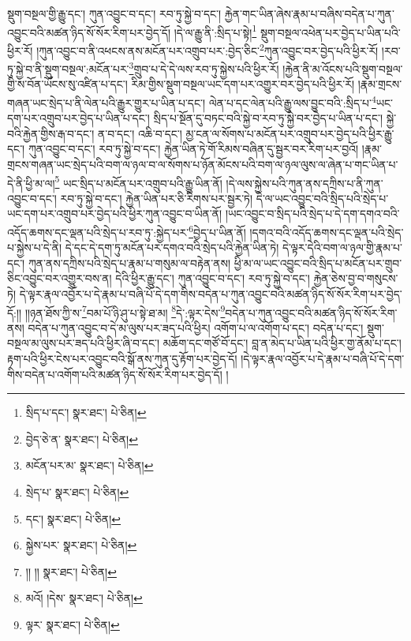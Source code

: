 སྡུག་བསྔལ་གྱི་རྒྱུ་དང་། ཀུན་འབྱུང་བ་དང་། རབ་ཏུ་སྐྱེ་བ་དང་། རྐྱེན་གང་ཡིན་ཞེས་རྣམ་པ་བཞིས་བདེན་པ་ཀུན་འབྱུང་བའི་མཚན་ཉིད་སོ་སོར་རིག་པར་བྱེད་དོ། །དེ་ལ་རྒྱུ་ནི་:སྲིད་པ་སྟེ།\footnote{སྲིད་པ་དང་།  སྣར་ཐང་།  པེ་ཅིན། } སྡུག་བསྔལ་འཕེན་པར་བྱེད་པ་ཡིན་པའི་ཕྱིར་རོ། །ཀུན་འབྱུང་བ་ནི་འཕངས་ནས་མངོན་པར་འགྲུབ་པར་:བྱེད་ཅིང་\footnote{བྱེད་ཅེ་ན་  སྣར་ཐང་།  པེ་ཅིན། }ཀུན་འབྱུང་བར་བྱེད་པའི་ཕྱིར་རོ། །རབ་ཏུ་སྐྱེ་བ་ནི་སྡུག་བསྔལ་:མངོན་པར་\footnote{མངོན་པར་མ་  སྣར་ཐང་།  པེ་ཅིན། }གྲུབ་པ་དེ་དེ་ལས་རབ་ཏུ་སྐྱེས་པའི་ཕྱིར་རོ། །རྐྱེན་ནི་མ་འོངས་པའི་སྡུག་བསྔལ་གྱི་ས་བོན་ཡོངས་སུ་འཛིན་པ་དང་། རིམ་གྱིས་སྡུག་བསྔལ་ཡང་དག་པར་འགྱུར་བར་བྱེད་པའི་ཕྱིར་རོ། །རྣམ་གྲངས་གཞན་ཡང་སྲེད་པ་ནི་ལེན་པའི་རྒྱུར་གྱུར་པ་ཡིན་པ་དང་། ལེན་པ་དང་ལེན་པའི་རྒྱུ་ལས་བྱུང་བའི་:སྲིད་པ་\footnote{སྲེད་པ་  སྣར་ཐང་།  པེ་ཅིན། }ཡང་དག་པར་འགྲུབ་པར་བྱེད་པ་ཡིན་པ་དང་། སྲིད་པ་སྔོན་དུ་བཏང་བའི་སྐྱེ་བ་རབ་ཏུ་སྐྱེ་བར་བྱེད་པ་ཡིན་པ་དང་། སྐྱེ་བའི་རྐྱེན་གྱིས་རྒ་བ་དང་། ན་བ་དང་། འཆི་བ་དང་། མྱ་ངན་ལ་སོགས་པ་མངོན་པར་འགྲུབ་པར་བྱེད་པའི་ཕྱིར་རྒྱུ་དང་། ཀུན་འབྱུང་བ་དང་། རབ་ཏུ་སྐྱེ་བ་དང་། རྐྱེན་ཡིན་ཏེ་གོ་རིམས་བཞིན་དུ་སྦྱར་བར་རིག་པར་བྱའོ། །རྣམ་གྲངས་གཞན་ཡང་སྲེད་པའི་བག་ལ་ཉལ་བ་ལ་སོགས་པ་ཉོན་མོངས་པའི་བག་ལ་ཉལ་ལུས་ལ་ཞེན་པ་གང་ཡིན་པ་དེ་ནི་ཕྱི་མ་ལ།\footnote{དང་།  སྣར་ཐང་།  པེ་ཅིན། } ཡང་སྲིད་པ་མངོན་པར་འགྲུབ་པའི་རྒྱུ་ཡིན་ནོ། །དེ་ལས་སྐྱེས་པའི་ཀུན་ནས་དཀྲིས་པ་ནི་ཀུན་འབྱུང་བ་དང་། རབ་ཏུ་སྐྱེ་བ་དང་། རྐྱེན་ཡིན་པར་ཅི་རིགས་པར་སྦྱར་ཏེ། དེ་ལ་ཡང་འབྱུང་བའི་སྲིད་པའི་སྲེད་པ་ཡང་དག་པར་འགྲུབ་པར་བྱེད་པའི་ཕྱིར་ཀུན་འབྱུང་བ་ཡིན་ནོ། །ཡང་འབྱུང་བ་སྲིད་པའི་སྲེད་པ་དེ་དག་དགའ་བའི་འདོད་ཆགས་དང་ལྡན་པའི་སྲེད་པ་རབ་ཏུ་:སྐྱེད་པར་\footnote{སྐྱེས་པར་  སྣར་ཐང་།  པེ་ཅིན། }བྱེད་པ་ཡིན་ནོ། །དགའ་བའི་འདོད་ཆགས་དང་ལྡན་པའི་སྲེད་པ་སྐྱེས་པ་དེ་ནི། དེ་དང་དེ་དག་ཏུ་མངོན་པར་དགའ་བའི་སྲེད་པའི་རྐྱེན་ཡིན་ཏེ། དེ་ལྟར་དེའི་བག་ལ་ཉལ་གྱི་རྣམ་པ་དང་། ཀུན་ནས་དཀྲིས་པའི་སྲེད་པ་རྣམ་པ་གསུམ་ལ་བརྟེན་ནས། ཕྱི་མ་ལ་ཡང་འབྱུང་བའི་སྲིད་པ་མངོན་པར་གྲུབ་ཅིང་འབྱུང་བར་འགྱུར་བས་ན། དེའི་ཕྱིར་རྒྱུ་དང་། ཀུན་འབྱུང་བ་དང་། རབ་ཏུ་སྐྱེ་བ་དང་། རྐྱེན་ཅེས་བྱ་བ་གསུངས་ཏེ། དེ་ལྟར་རྣལ་འབྱོར་པ་དེ་རྣམ་པ་བཞི་པོ་དེ་དག་གིས་བདེན་པ་ཀུན་འབྱུང་བའི་མཚན་ཉིད་སོ་སོར་རིག་པར་བྱེད་དོ:།། །།ཉན་ཐོས་ཀྱི་ས་\footnote{།། །།  སྣར་ཐང་།  པེ་ཅིན། }བམ་པོ་ཉི་ཤུ་པ་སྟེ་ཐ་མ། \footnote{མའོ། །དེས་  སྣར་ཐང་།  པེ་ཅིན། }དེ་:ལྟར་དེས་\footnote{ལྟར་  སྣར་ཐང་།  པེ་ཅིན། }བདེན་པ་ཀུན་འབྱུང་བའི་མཚན་ཉིད་སོ་སོར་རིག་ནས། བདེན་པ་ཀུན་འབྱུང་བ་དེ་མ་ལུས་པར་ཟད་པའི་ཕྱིར། འགོག་པ་ལ་འགོག་པ་དང་། བདེན་པ་དང་། སྡུག་བསྔལ་མ་ལུས་པར་ཟད་པའི་ཕྱིར་ཞི་བ་དང་། མཆོག་དང་གཙོ་བོ་དང་། བླ་ན་མེད་པ་ཡིན་པའི་ཕྱིར་གྱ་ནོམ་པ་དང་། རྟག་པའི་ཕྱིར་ངེས་པར་འབྱུང་བའི་སྒོ་ནས་ཀུན་དུ་རྟོག་པར་བྱེད་དོ། །དེ་ལྟར་རྣལ་འབྱོར་པ་དེ་རྣམ་པ་བཞི་པོ་དེ་དག་གིས་བདེན་པ་འགོག་པའི་མཚན་ཉིད་སོ་སོར་རིག་པར་བྱེད་དོ། །
